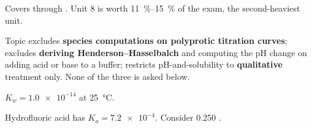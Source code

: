\documentclass{apchem-exam}
\begin{document}
\apctitleblock

\begin{apcnote}
Covers  through . Unit 8 is worth
\SI{11}{\percent}--\SI{15}{\percent} of the exam, the second-heaviest
unit.

Topic  excludes \textbf{species computations on polyprotic
titration curves};  excludes \textbf{deriving
Henderson--Hasselbalch} and computing the pH change on adding acid or base
to a buffer;  restricts pH-and-solubility to
\textbf{qualitative} treatment only. None of the three is asked below.

$K_w = \num{1.0e-14}$ at \SI{25}{\celsius}.
\end{apcnote}



Hydrofluoric acid has $K_a = \num{7.2e-4}$. Consider
\SI{0.250}{\Molar} .
\end{document}
